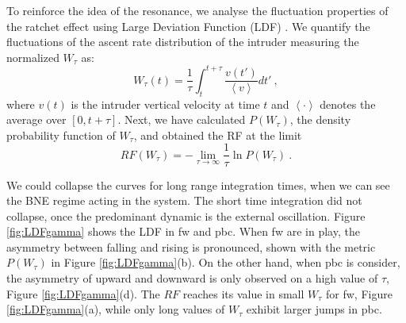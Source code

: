     To reinforce the idea of the resonance, we analyse the fluctuation properties of the ratchet effect using Large Deviation Function (LDF) \cite{Symmetry_properties_of_the_large-deviation_function_of_the_velocity_of_a_self-propelled_polar_particle, Large_Deviations_in_Physics}. We quantify the fluctuations of the ascent rate distribution of the intruder measuring the normalized  $W_{\tau}$ as:
%
\begin{equation}
    W_{\tau}(t) = \frac{1}{\tau} \int_t^{t+\tau} \frac{v(t')}{\left<v\right>} dt'~, 
\end{equation}
%
where $v(t)$ is the intruder vertical velocity at time $t$ and $\left< \cdot \right>$ denotes the average over $[0,t+\tau]$. Next, we have calculated $P(W_{\tau})$, the density probability function of $W_\tau$, and obtained the RF at the limit
%
\begin{equation}
    RF(W_\tau) = -\lim_{\tau \rightarrow \infty} \frac{1}{\tau} \ln P(W_\tau)~.
\end{equation}

    We could collapse the curves for long range integration times, when we can see the BNE regime acting in the system. The short time integration did not collapse, once the predominant dynamic is the external oscillation. Figure \ref{fig:LDFgamma} shows the LDF in fw and pbc. When fw are in play, the asymmetry between falling and rising is pronounced, shown with the metric $P(W_{\tau})$ in Figure \ref{fig:LDFgamma}(b). On the other hand, when pbc is consider, the asymmetry of upward and downward is only observed on a high value of $\tau$, Figure \ref{fig:LDFgamma}(d). The $RF$ reaches its value in small $W_{\tau}$ for fw, Figure \ref{fig:LDFgamma}(a), while only long values of $W_{\tau}$ exhibit larger jumps in pbc.

